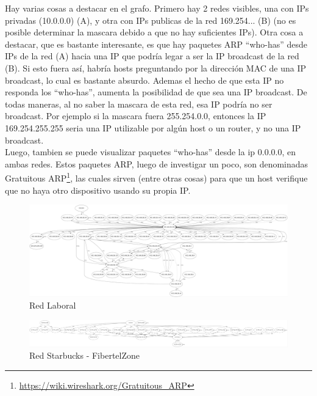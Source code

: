 Hay varias cosas a destacar en el grafo. Primero hay 2 redes visibles, una con IPs privadas (10.0.0.0) (A), y otra con IPs publicas de la red 169.254... (B) (no es posible determinar la mascara debido a que no hay suficientes IPs). Otra cosa a destacar, que es bastante interesante, es que hay paquetes ARP ``who-has'' desde IPs de la red (A) hacia una IP que podría legar a ser la IP broadcast de la red (B). Si esto fuera así, habría hosts preguntando por la dirección MAC de una IP broadcast, lo cual es bastante absurdo. Ademas el hecho de que esta IP no responda los ``who-has'', aumenta la posibilidad de que sea una IP broadcast. De todas maneras, al no saber la mascara de esta red, esa IP podría no ser broadcast. Por ejemplo si la mascara fuera 255.254.0.0, entonces la IP 169.254.255.255 seria una IP utilizable por algún host o un router, y no una IP broadcast.\\

Luego, tambien se puede visualizar paquetes ``who-has'' desde la ip 0.0.0.0, en ambas redes. Estos paquetes ARP, luego de investigar un poco, son denominadas Gratuitous ARP\footnote{\url{https://wiki.wireshark.org/Gratuitous_ARP}}, las cuales sirven (entre otras cosas) para que un host verifique que no haya otro dispositivo usando su propia IP.


\begin{figure}
  \begin{center}
      \includegraphics[width=270mm,angle=270]{graficos/grafo-baufest.jpg}
	\caption{Red Laboral}
    \label{fig:bf-graph}  
  \end{center}
\end{figure}

\begin{figure}
  \begin{center}
    \includegraphics[width=270mm,angle=270]{graficos/grafo-starbucks.jpg}
	\caption{Red Starbucks - FibertelZone}
    \label{fig:satrbucks-graph}  
  \end{center}
\end{figure}
